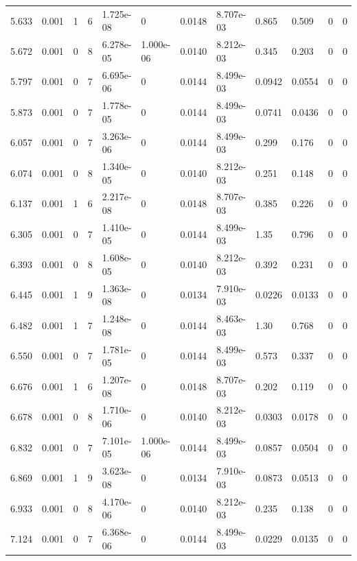 \documentclass[preview]{standalone}
\begin{document}
{{{\begin{tabular}{L{1.2cm}C{1.2cm} C{0.3cm}C{0.5cm} C{1.4cm}C{1.4cm} C{1.4cm}C{1.4cm} C{1.6cm}C{1.6cm} C{1.6cm}C{1.6cm}}
  5.633  &  0.001  & 1     &  6 &  1.725e-08  & 0  &  0.0148&   8.707e-03& 0.865 & 0.509   &  0 & 0  \\ 
  5.672  &  0.001  & 0     &  8 &  6.278e-05  & 1.000e-06  &  0.0140&   8.212e-03& 0.345 & 0.203   &  0 & 0  \\ 
  5.797  &  0.001  & 0     &  7 &  6.695e-06  & 0  &  0.0144&   8.499e-03& 0.0942 & 0.0554   &  0 & 0  \\ 
  5.873  &  0.001  & 0     &  7 &  1.778e-05  & 0  &  0.0144&   8.499e-03& 0.0741 & 0.0436   &  0 & 0  \\ 
  6.057  &  0.001  & 0     &  7 &  3.263e-06  & 0  &  0.0144&   8.499e-03& 0.299 & 0.176   &  0 & 0  \\ 
  6.074  &  0.001  & 0     &  8 &  1.340e-05  & 0  &  0.0140&   8.212e-03& 0.251 & 0.148   &  0 & 0  \\ 
  6.137  &  0.001  & 1     &  6 &  2.217e-08  & 0  &  0.0148&   8.707e-03& 0.385 & 0.226   &  0 & 0  \\ 
  6.305  &  0.001  & 0     &  7 &  1.410e-05  & 0  &  0.0144&   8.499e-03& 1.35 & 0.796   &  0 & 0  \\ 
  6.393  &  0.001  & 0     &  8 &  1.608e-05  & 0  &  0.0140&   8.212e-03& 0.392 & 0.231   &  0 & 0  \\ 
  6.445  &  0.001  & 1     &  9 &  1.363e-08  & 0  &  0.0134&   7.910e-03& 0.0226 & 0.0133   &  0 & 0  \\ 
  6.482  &  0.001  & 1     &  7 &  1.248e-08  & 0  &  0.0144&   8.463e-03& 1.30 & 0.768   &  0 & 0  \\ 
  6.550  &  0.001  & 0     &  7 &  1.781e-05  & 0  &  0.0144&   8.499e-03& 0.573 & 0.337   &  0 & 0  \\ 
  6.676  &  0.001  & 1     &  6 &  1.207e-08  & 0  &  0.0148&   8.707e-03& 0.202 & 0.119   &  0 & 0  \\ 
  6.678  &  0.001  & 0     &  8 &  1.710e-06  & 0  &  0.0140&   8.212e-03& 0.0303 & 0.0178   &  0 & 0  \\ 
  6.832  &  0.001  & 0     &  7 &  7.101e-05  & 1.000e-06  &  0.0144&   8.499e-03& 0.0857 & 0.0504   &  0 & 0  \\ 
  6.869  &  0.001  & 1     &  9 &  3.623e-08  & 0  &  0.0134&   7.910e-03& 0.0873 & 0.0513   &  0 & 0  \\ 
  6.933  &  0.001  & 0     &  8 &  4.170e-06  & 0  &  0.0140&   8.212e-03& 0.235 & 0.138   &  0 & 0  \\ 
  7.124  &  0.001  & 0     &  7 &  6.368e-06  & 0  &  0.0144&   8.499e-03& 0.0229 & 0.0135   &  0 & 0  \\ 

\end{tabular}}}}
\end{document}
